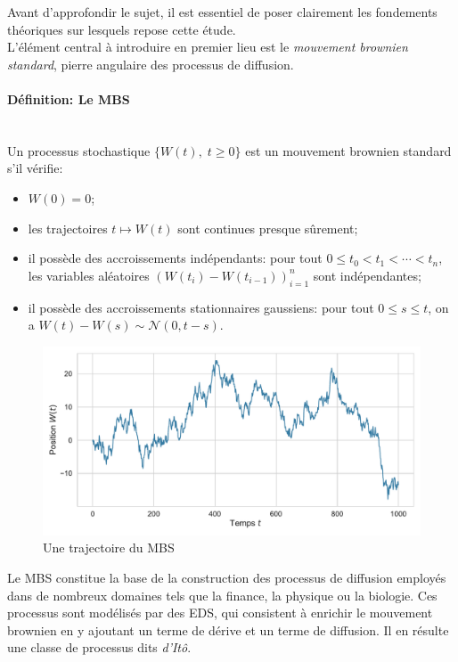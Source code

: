 Avant d'approfondir le sujet, il est essentiel de poser clairement les fondements théoriques sur lesquels repose cette étude.\\
L'élément central à introduire en premier lieu est le \textit{mouvement brownien standard}, pierre angulaire des processus de diffusion.
\paragraph{Définition: Le \acl{MBS}}\mbox{}\\ 
Un processus stochastique $\{W(t),\;t\geq0\}$ est un mouvement brownien standard s'il vérifie:
\begin{itemize}
    \item $W(0) = 0$;
    \item les trajectoires $t \mapsto W(t)$ sont continues presque sûrement;
    \item il possède des accroissements indépendants: pour tout $0 \leq t_0 < t_1 < \cdots < t_n$, les variables aléatoires ${\left(W(t_i) - W(t_{i-1})\right)}_{i=1}^n$ sont indépendantes;
    \item il possède des accroissements stationnaires gaussiens: pour tout $0 \leq s \leq t$, on a $W(t) - W(s) \sim \mathcal{N}(0, t - s)$.
\end{itemize}
\begin{figure}[htb]
    \centering
    \includegraphics[width=0.9\linewidth]{img/intro/path_MBS.pdf}
    \caption{Une trajectoire du \acl{MBS}}\label{fig:TrajMBS}
\end{figure}
\FloatBarrier Le \acs{MBS} constitue la base de la construction des processus de diffusion employés dans de nombreux domaines tels que la finance, la physique ou la biologie. Ces processus sont modélisés par des \acf{EDS}, qui consistent à enrichir le mouvement brownien en y ajoutant un terme de dérive et un terme de diffusion. Il en résulte une classe de processus dits \textit{d'Itô}.

